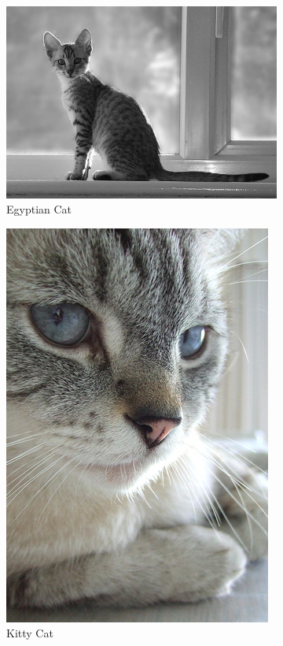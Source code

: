 \documentclass[pageno]{jpaper}
\begin{document}
\begin{figure}
\begin{subfigure}{.2\textwidth}
  \centering
  \includegraphics[scale=0.1]{classTypeExample5.jpg}
  \caption{Egyptian Cat}
\end{subfigure}
\begin{subfigure}{.2\textwidth}
  \centering
  \includegraphics[scale=0.11]{classTypeExample6.jpg}
  \caption{Kitty Cat}
\end{subfigure}
\begin{subfigure}{.2\textwidth}
  \centering

\end{subfigure}
\end{figure}
\end{document}
